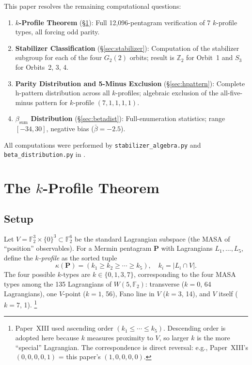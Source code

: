 \documentclass[11pt,a4paper]{article}
\theoremstyle{remark}
\begin{document}
This paper resolves the remaining computational questions:

\begin{enumerate}
  \item \textbf{$k$-Profile Theorem} (\S\ref{sec:kprofile}):
        Full 12{,}096-pentagram verification of 7 $k$-profile types, all forcing
        odd parity.

  \item \textbf{Stabilizer Classification} (\S\ref{sec:stabilizer}):
        Computation of the stabilizer subgroup for each of the four
        $G_2(2)$ orbits; result is $\mathbb{Z}_2$ for Orbit~1 and $S_3$ for
        Orbits~2, 3, 4.

  \item \textbf{Parity Distribution and 5-Minus Exclusion}
        (\S\ref{sec:hpattern}):
        Complete h-pattern distribution across all $k$-profiles;
        algebraic exclusion of the all-five-minus pattern for $k$-profile
        $(7,1,1,1,1)$.

  \item \textbf{$\beta_{\mathrm{sum}}$ Distribution} (\S\ref{sec:betadist}):
        Full-enumeration statistics; range $[-34, 30]$, negative bias
        ($\bar{\beta} = -2.5$).
\end{enumerate}

\noindent
All computations were performed by \texttt{stabilizer\_algebra.py} and
\texttt{beta\_distribution.py} in \cite{PaperXIVsuppl}.


\section{\texorpdfstring{The $k$-Profile Theorem}{The k-Profile Theorem}}\label{sec:kprofile}

\subsection{Setup}

Let $V = \mathbb{F}_2^3 \times \{0\}^3 \subset \mathbb{F}_2^6$ be the
standard Lagrangian subspace (the MASA of ``position'' observables).
For a Mermin pentagram $\mathbf{P}$ with Lagrangians $L_1,\ldots,L_5$, define
the \emph{$k$-profile} as the sorted tuple
\[
  \kappa(\mathbf{P}) = (k_1 \geq k_2 \geq \cdots \geq k_5),
  \quad k_i = |L_i \cap V|.
\]
The four possible $k$-types are $k \in \{0,1,3,7\}$, corresponding to the
four MASA types among the 135 Lagrangians of $W(5,\mathbb{F}_2)$: transverse
($k=0$, 64 Lagrangians), one $V$-point ($k=1$, 56), Fano line in $V$ ($k=3$,
14), and $V$ itself ($k=7$, 1).%
\footnote{Paper~XIII used ascending order $(k_1 \leq \cdots \leq k_5)$.
Descending order is adopted here because $k$ measures proximity to $V$,
so larger $k$ is the more ``special'' Lagrangian.
The correspondence is direct reversal:
e.g., Paper~XIII's $(0,0,0,0,1)$ = this paper's $(1,0,0,0,0)$.}
\end{document}
